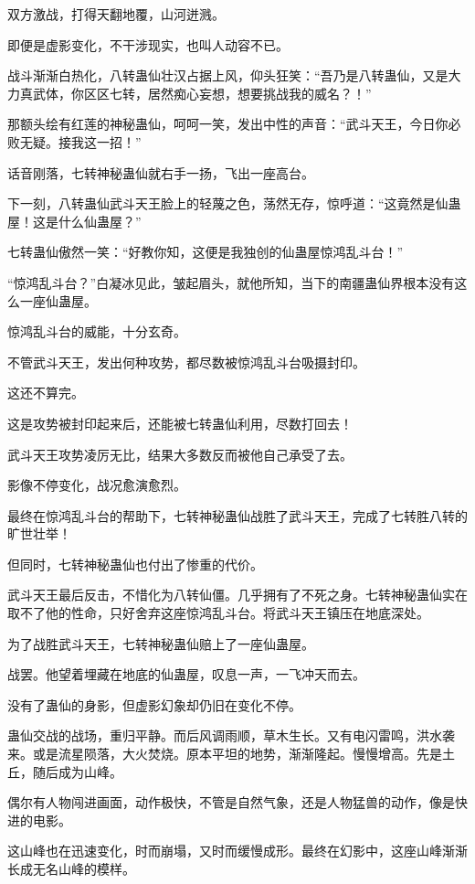 
\begin{this_body}

双方激战，打得天翻地覆，山河迸溅。

即便是虚影变化，不干涉现实，也叫人动容不已。

战斗渐渐白热化，八转蛊仙壮汉占据上风，仰头狂笑：“吾乃是八转蛊仙，又是大力真武体，你区区七转，居然痴心妄想，想要挑战我的威名？！”

那额头绘有红莲的神秘蛊仙，呵呵一笑，发出中性的声音：“武斗天王，今日你必败无疑。接我这一招！”

话音刚落，七转神秘蛊仙就右手一扬，飞出一座高台。

下一刻，八转蛊仙武斗天王脸上的轻蔑之色，荡然无存，惊呼道：“这竟然是仙蛊屋！这是什么仙蛊屋？”

七转蛊仙傲然一笑：“好教你知，这便是我独创的仙蛊屋惊鸿乱斗台！”

“惊鸿乱斗台？”白凝冰见此，皱起眉头，就他所知，当下的南疆蛊仙界根本没有这么一座仙蛊屋。

惊鸿乱斗台的威能，十分玄奇。

不管武斗天王，发出何种攻势，都尽数被惊鸿乱斗台吸摄封印。

这还不算完。

这是攻势被封印起来后，还能被七转蛊仙利用，尽数打回去！

武斗天王攻势凌厉无比，结果大多数反而被他自己承受了去。

影像不停变化，战况愈演愈烈。

最终在惊鸿乱斗台的帮助下，七转神秘蛊仙战胜了武斗天王，完成了七转胜八转的旷世壮举！

但同时，七转神秘蛊仙也付出了惨重的代价。

武斗天王最后反击，不惜化为八转仙僵。几乎拥有了不死之身。七转神秘蛊仙实在取不了他的性命，只好舍弃这座惊鸿乱斗台。将武斗天王镇压在地底深处。

为了战胜武斗天王，七转神秘蛊仙赔上了一座仙蛊屋。

战罢。他望着埋藏在地底的仙蛊屋，叹息一声，一飞冲天而去。

没有了蛊仙的身影，但虚影幻象却仍旧在变化不停。

蛊仙交战的战场，重归平静。而后风调雨顺，草木生长。又有电闪雷鸣，洪水袭来。或是流星陨落，大火焚烧。原本平坦的地势，渐渐隆起。慢慢增高。先是土丘，随后成为山峰。

偶尔有人物闯进画面，动作极快，不管是自然气象，还是人物猛兽的动作，像是快进的电影。

这山峰也在迅速变化，时而崩塌，又时而缓慢成形。最终在幻影中，这座山峰渐渐长成无名山峰的模样。


\end{this_body}
